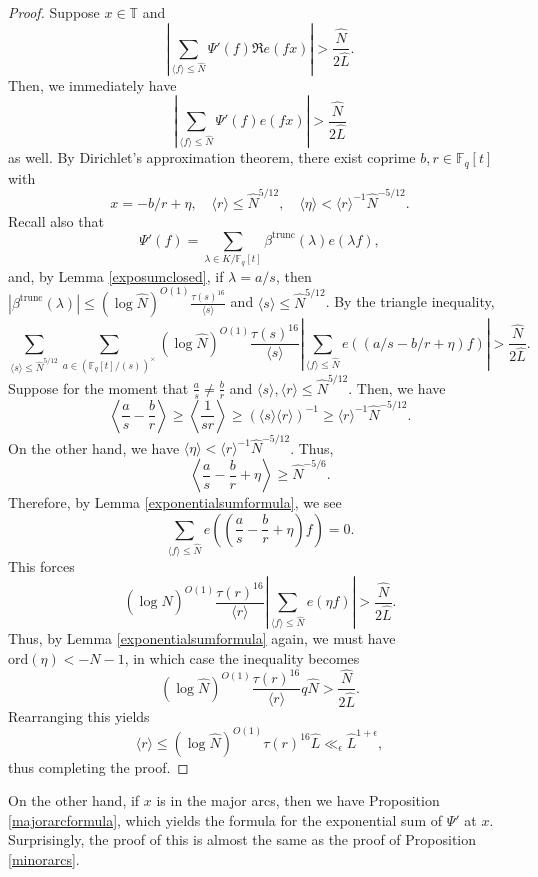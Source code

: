 \documentclass{article}
\theoremstyle{definition}
\theoremstyle{definition}
\theoremstyle{remark}
\newcommand{\F}{\mathbb{F}_q[t]}
\newcommand{\1}{\mathbf{1}}
\numberwithin{equation}{section}
\begin{document}
\begin{proof}
Suppose $x\in \mathbb{T}$ and 
\[\left|\sum_{\langle f\rangle \leq \widehat{N}} \Psi'(f)\Re e(fx)\right|>\frac{\widehat{N}}{2\widehat{L}}.\]
Then, we immediately have 
\[\left|\sum_{\langle f\rangle \leq \widehat{N}} \Psi'(f) e(fx)\right|>\frac{\widehat{N}}{2\widehat{L}}\]
as well. By Dirichlet's approximation theorem, there exist coprime $b, r\in \F$ with 
\[x=-b\slash r+\eta, \quad\langle r \rangle \leq \widehat{N}^{5\slash 12}, \quad\langle \eta \rangle < \langle r\rangle^{-1}\widehat{N}^{-5\slash 12}.\]
Recall also that 
\[\Psi'(f)=\sum_{\lambda\in K\slash \F}\beta^{\text{trunc}}(\lambda)e(\lambda f),\]
and, by Lemma \ref{exposumclosed}, 
if $\lambda = a\slash s$, then $|\beta^{\text{trunc}}(\lambda)|\leq (\log \widehat{N})^{O(1)}\frac{\tau(s)^{16}}{\langle s \rangle }$ and $\langle s \rangle \leq \widehat{N}^{5\slash 12}$. By the triangle inequality, 
\[\sum_{\langle s \rangle \leq \widehat{N}^{5\slash 12}}\sum_{a\in (\F\slash (s))^\times}(\log \widehat{N})^{O(1)}\frac{\tau(s)^{16}}{\langle s \rangle }\left|\sum_{\langle f \rangle \leq \widehat{N}}e((a\slash s -b\slash r+\eta)f)\right|>\frac{\widehat{N}}{2\widehat{L}}.\]
Suppose for the moment that $\frac{a}{s}\neq \frac{b}{r}$ and $\langle s\rangle, \langle r \rangle \leq \widehat{N}^{5\slash 12}$. Then, we have 
\[\left\langle \frac{a}{s}-\frac{b}{r}\right\rangle \geq \left\langle \frac{1}{sr}\right\rangle \geq (\langle s\rangle \langle r\rangle)^{-1}\geq \langle r \rangle^{-1}\widehat{N}^{-5\slash 12}.\]
On the other hand, we have $\langle \eta \rangle < \langle r\rangle^{-1}\widehat{N}^{-5\slash 12}$. Thus, 
\[\left\langle \frac{a}{s} - \frac{b}{r} + \eta \right\rangle \geq \widehat{N}^{-5\slash 6}.\]
Therefore, by Lemma \ref{exponentialsumformula}, we see 
\[ \sum_{\langle f\rangle\leq \widehat{N}} e\left( \left( \frac{a}{s} - \frac{b}{r} + \eta \right)f\right)=0.\]
This forces 
\[(\log \widehat{N})^{O(1)}\frac{\tau(r)^{16}}{\langle r \rangle }\left|\sum_{\langle f \rangle \leq \widehat{N}}e(\eta f)\right|>\frac{\widehat{N}}{2\widehat{L}}.\]
Thus, by Lemma \ref{exponentialsumformula} again, we must have $\text{ord}(\eta)<-N-1$, in which case the inequality becomes 
\[(\log \widehat{N})^{O(1)}\frac{\tau(r)^{16}}{\langle r \rangle }q\widehat{N}>\frac{\widehat{N}}{2\widehat{L}}.\]
Rearranging this yields 
\[\langle r \rangle \leq (\log \widehat{N})^{O(1)}\tau(r)^{16}\widehat{L}\ll_\epsilon \widehat{L}^{1+\epsilon},\]
thus completing the proof. 
\end{proof}

On the other hand, if $x$ is in the major arcs, then we have Proposition \ref{majorarcformula}, which yields the formula for the exponential sum of $\Psi'$ at $x$. Surprisingly, the proof of this is almost the same as the proof of Proposition \ref{minorarcs}. 
\end{document}
